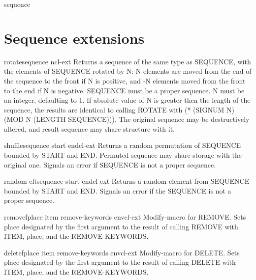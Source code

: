 \begin{class}{sequence}{}{}{}
  
\end{class}

\section{Sequence extensions}
\label{sec:sequence-extensions}

\begin{function}{rotate}{sequence \op n}{cl-ext}{}
  Returns a sequence of the same type as SEQUENCE, with the elements of
SEQUENCE rotated by N: N elements are moved from the end of the sequence to
the front if N is positive, and -N elements moved from the front to the end if
N is negative. SEQUENCE must be a proper sequence. N must be an integer,
defaulting to 1. If absolute value of N is greater then the length of the
sequence, the results are identical to calling ROTATE with (* (SIGNUM N) (MOD
N (LENGTH SEQUENCE))). The original sequence may be destructively altered, and
result sequence may share structure with it.
\end{function}

\begin{function}{shuffle}{sequence \key start end}{cl-ext}{}
  Returns a random permutation of SEQUENCE bounded by START and END.
Permuted sequence may share storage with the original one. Signals an
error if SEQUENCE is not a proper sequence.
\end{function}

\begin{function}{random-elt}{sequence \key start end}{cl-ext}{}
  Returns a random element from SEQUENCE bounded by START and END. Signals an
error if the SEQUENCE is not a proper sequence.
\end{function}

\begin{macro}{removef}{place item \rest remove-keywords \env env}{cl-ext}{}
  Modify-macro for REMOVE. Sets place designated by the first argument to
the result of calling REMOVE with ITEM, place, and the REMOVE-KEYWORDS.
\end{macro}

\begin{macro}{deletef}{place item \rest remove-keywords \env env}{cl-ext}{}
  Modify-macro for DELETE. Sets place designated by the first argument to
the result of calling DELETE with ITEM, place, and the REMOVE-KEYWORDS.
\end{macro}

